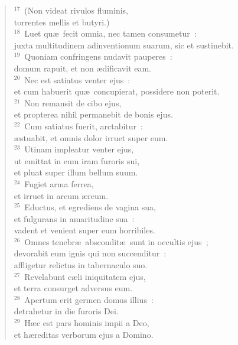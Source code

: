 \begin{flushleft}
\begin{verse}
${}^{17}$~(Non videat rivulos fluminis,\\ torrentes mellis et butyri.)\\
${}^{18}$~Luet qu\ae\ fecit omnia, nec tamen consumetur~:\\ juxta multitudinem adinventionum suarum, sic et sustinebit.\\
${}^{19}$~Quoniam confringens nudavit pauperes~:\\ domum rapuit, et non \ae dificavit eam.\\
${}^{20}$~Nec est satiatus venter ejus~:\\ et cum habuerit qu\ae\ concupierat, possidere non poterit.\\
${}^{21}$~Non remansit de cibo ejus,\\ et propterea nihil permanebit de bonis ejus.\\
${}^{22}$~Cum satiatus fuerit, arctabitur~:\\ \ae stuabit, et omnis dolor irruet super eum.\\
${}^{23}$~Utinam impleatur venter ejus,\\ ut emittat in eum iram furoris sui,\\ et pluat super illum bellum suum.\\
${}^{24}$~Fugiet arma ferrea,\\ et irruet in arcum \ae reum.\\
${}^{25}$~Eductus, et egrediens de vagina sua,\\ et fulgurans in amaritudine sua~:\\ vadent et venient super eum horribiles.\\
${}^{26}$~Omnes tenebr\ae\ abscondit\ae\ sunt in occultis ejus~;\\ devorabit eum ignis qui non succenditur~:\\ affligetur relictus in tabernaculo suo.\\
${}^{27}$~Revelabunt c\ae li iniquitatem ejus,\\ et terra consurget adversus eum.\\
${}^{28}$~Apertum erit germen domus illius~:\\ detrahetur in die furoris Dei.\\
${}^{29}$~H\ae c est pars hominis impii a Deo,\\ et h\ae reditas verborum ejus a Domino.\end{verse}\end{flushleft}



